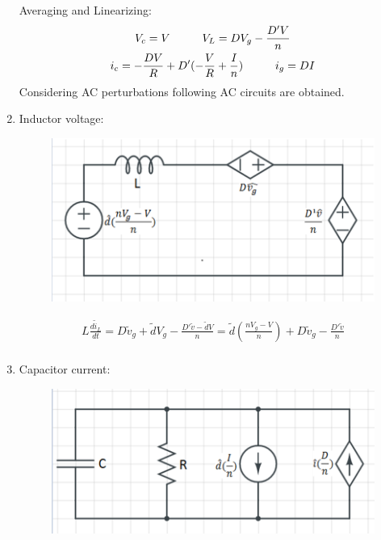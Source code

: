 \documentclass{article}
\newcommand\tab[1][1cm]{\hspace*{#1}}
\begin{document}
\begin{enumerate}
    
    Averaging and Linearizing:
    \begin{gather*}
        V_c=V \tab V_L=DV_g-\frac{D'V}{n}\\
        i_c=-\frac{DV}{R}+D'(-\frac{V}{R}+\frac{I}{n}) \tab i_g=DI\\
    \end{gather*}
    Considering AC perturbations following AC circuits are obtained.
    \item Inductor voltage:
    \begin{figure}[H]
        \centering
        \includegraphics[scale=0.75]{x1.png}
        \label{fig:my_label}
    \end{figure}
    
    \begin{gather*}
        L\frac{d\tilde i_L}{dt}=D\tilde v_g+\tilde dV_g-\frac{D'\tilde v-\tilde dV}{n}=\tilde d (\frac{nV_g-V}{n})+D\tilde v_g-\frac{D'\tilde v}{n}\\
    \end{gather*}
    
    \item Capacitor current:
    \begin{figure}[H]
        \centering
        \includegraphics[scale=0.75]{x2.png}
        \label{fig:my_label}
    \end{figure}
    

\end{enumerate}
\end{document}
